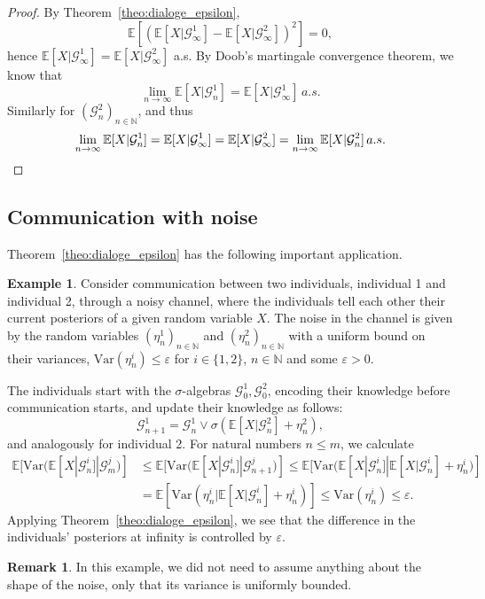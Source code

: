 \documentclass[a4paper, 10pt]{article}
\numberwithin{theorem}{section}
\theoremstyle{definition}
\newtheorem{example}[theorem]{Example}
\newtheorem{remark}[theorem]{Remark}
\newcommand{\N}{\mathbb{N}}
\newcommand{\E}{\mathbb{E}}
\newcommand{\G}{\mathcal{G}}
\newcommand{\Var}{\mathrm{Var}}
\renewcommand{\epsilon}{\varepsilon}
\begin{document}
\begin{proof}
By Theorem~\ref{theo:dialoge_epsilon}, 
$$\E[( \E[X|\G^1_\infty]-  \E[X|\G^2_\infty]  )^2]=0,$$
hence 
 $  \E[X|\G^1_\infty] = \E[X|\G^2_\infty]$ a.s.
 By Doob's martingale convergence theorem, we know that
 $$\lim_{n\to\infty} \E[X|\G^1_n] = \E[X|\G^1_\infty] \, a.s.$$
Similarly for $(\G^2_n)_{n\in \N}$, and thus
 \[ \lim_{n\to\infty} \E[X|\G^1_n] = \E[X|\G^1_\infty] = \E[X|\G^2_\infty] = \lim_{n\to\infty} \E[X|\G^2_n] \, a.s. \qedhere \] 
\end{proof}

\subsection{Communication with noise}

Theorem~\ref{theo:dialoge_epsilon} has the following important application.

\begin{example}\label{ex:com_noise}
Consider communication between two individuals, individual 1 and individual 2, through a noisy channel, where the individuals tell each other their current posteriors of a given random variable $X$. The noise in the channel is given by the random variables $(\eta^1_n)_{n\in\N}$ and $(\eta^2_n)_{n\in\N}$ with a uniform bound on their variances, $\Var(\eta^i_n) \leq \epsilon$ for $i \in \{1,2\}$, $n \in \N$ and some $\epsilon > 0$.

The individuals start with the $\sigma$-algebras $\G^1_0,\G^2_0$, encoding their knowledge before communication starts, and update their knowledge as follows:
$$
\G^1_{n+1} = \G_n^1 \vee \sigma ( \E[X|\G^2_n] + \eta_n^2 ),
$$	
and analogously for individual 2. 
For natural numbers $n \leq m $, we calculate
	\begin{align*}
\E[ \Var( \E[X | \G^i_n] | \G^j_{m} )] &\leq \E[ \Var( \E[X | \G^i_n] | \G^j_{n+1} )] \le \E [ \Var( \E[X | \G^i_n] | \E[X|\G^i_n] 
 + \eta_n^i )] \\ &=\E[ \Var(\eta_n^i | \E[X|\G^i_n] + \eta_n^i )] \le \Var(\eta_n^i) \le \epsilon.
	\end{align*}
Applying Theorem~\ref{theo:dialoge_epsilon}, we see that the difference in the individuals' posteriors at infinity is controlled by $\epsilon$.
\end{example}

\begin{remark}
	 In this example, we did not need to assume anything about the shape of the noise, only that its variance is uniformly bounded.
\end{remark}
\end{document}
